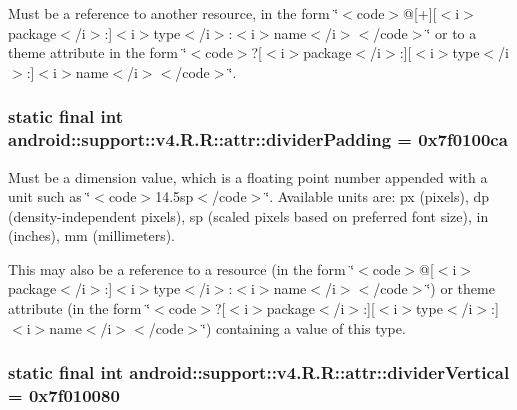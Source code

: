 Must be a reference to another resource, in the form \char`\"{}$<$code$>$@\mbox{[}+\mbox{]}\mbox{[}$<$i$>$package$<$/i$>$:\mbox{]}$<$i$>$type$<$/i$>$:$<$i$>$name$<$/i$>$$<$/code$>$\char`\"{} or to a theme attribute in the form \char`\"{}$<$code$>$?\mbox{[}$<$i$>$package$<$/i$>$:\mbox{]}\mbox{[}$<$i$>$type$<$/i$>$:\mbox{]}$<$i$>$name$<$/i$>$$<$/code$>$\char`\"{}. \hypertarget{classandroid_1_1support_1_1v4_1_1_r_1_1attr_7d3d917328f2edd9985441f8be63d22c}{
\subsubsection[{dividerPadding}]{\setlength{\rightskip}{0pt plus 5cm}static final int android::support::v4.R.R::attr::dividerPadding = 0x7f0100ca}}
\label{classandroid_1_1support_1_1v4_1_1_r_1_1attr_7d3d917328f2edd9985441f8be63d22c}


Must be a dimension value, which is a floating point number appended with a unit such as \char`\"{}$<$code$>$14.5sp$<$/code$>$\char`\"{}. Available units are: px (pixels), dp (density-independent pixels), sp (scaled pixels based on preferred font size), in (inches), mm (millimeters). 

This may also be a reference to a resource (in the form \char`\"{}$<$code$>$@\mbox{[}$<$i$>$package$<$/i$>$:\mbox{]}$<$i$>$type$<$/i$>$:$<$i$>$name$<$/i$>$$<$/code$>$\char`\"{}) or theme attribute (in the form \char`\"{}$<$code$>$?\mbox{[}$<$i$>$package$<$/i$>$:\mbox{]}\mbox{[}$<$i$>$type$<$/i$>$:\mbox{]}$<$i$>$name$<$/i$>$$<$/code$>$\char`\"{}) containing a value of this type. \hypertarget{classandroid_1_1support_1_1v4_1_1_r_1_1attr_1a594aefe9a506d171a01c60057e3f81}{
\subsubsection[{dividerVertical}]{\setlength{\rightskip}{0pt plus 5cm}static final int android::support::v4.R.R::attr::dividerVertical = 0x7f010080}}
\label{classandroid_1_1support_1_1v4_1_1_r_1_1attr_1a594aefe9a506d171a01c60057e3f81}


